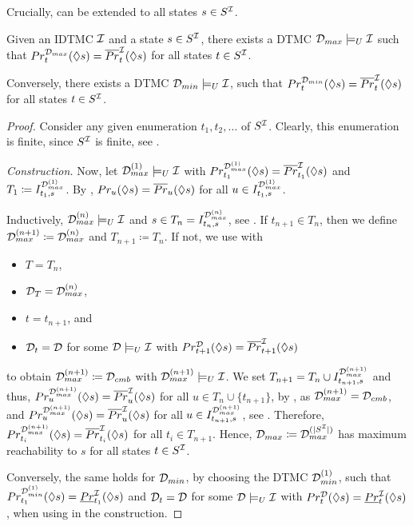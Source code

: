 Crucially,  can be extended to all states $s\in S^{\mathcal{I}}$.
\begin{theorem}\label{th:existence_of_dtmc_with_universal_max_reach}
    Given an IDTMC $\mathcal{I}$ and a state $s\in S^{\mathcal{I}}$, there exists a DTMC $\mathcal{D}_{max} \models_U \mathcal{I}$ such that $Pr_t^{\mathcal{D}_{max}}(\lozenge s) = \overline{Pr}^{\mathcal{I}}_t(\lozenge s)$ for all states $t\in S^{\mathcal{I}}$.

    Conversely, there exists a DTMC $\mathcal{D}_{min} \models_U \mathcal{I}$, such that $Pr_t^{\mathcal{D}_{min}}(\lozenge s) = \overline{Pr}^{\mathcal{I}}_t(\lozenge s)$ for all states $t\in S^{\mathcal{I}}$.
\end{theorem}

\begin{proof}
    Consider any given enumeration $t_1, t_2, \dots$ of $S^{\mathcal{I}}$. Clearly, this enumeration is finite, since $S^{\mathcal{I}}$ is finite, see .
    
    \emph{Construction.} Now, let $\mathcal{D}_{max}^{(1)}\models_U \mathcal{I}$ with $Pr_{t_1}^{\mathcal{D}_{max}^{(1)}}(\lozenge s) = \overline{Pr}^{\mathcal{I}}_{t_1}(\lozenge s)$ and $T_1 \coloneq I^{\mathcal{D}_{max}^{(1)}}_{t_1,s}$. By , $Pr_u(\lozenge s) = \overline{Pr}_u(\lozenge s)$ for all $u\in I^{\mathcal{D}_{max}^{(1)}}_{t_1,s}$.

    Inductively, $\mathcal{D}_{max}^{(n)} \models_U \mathcal{I}$ and $s\in T_n = I^{\mathcal{D}_{max}^{(n)}}_{t_n,s}$, see .
    If $t_{n+1}\in T_n$, then we define $\mathcal{D}_{max}^{(n+1)} \coloneq \mathcal{D}_{max}^{(n)}$ and $T_{n+1} \coloneq T_n$. If not, we use  with 
    \begin{itemize}
        \item $T = T_n$,
        \item $\mathcal{D}_T = \mathcal{D}_{max}^{(n)}$,
        \item $t = t_{n+1}$, and
        \item $\mathcal{D}_t = \mathcal{D}$ for some $\mathcal{D} \models_U \mathcal{I}$ with $Pr^{\mathcal{D}}_{t+1}(\lozenge s) = \overline{Pr}_{t+1}^{\mathcal{I}}(\lozenge s)$
    \end{itemize}
    to obtain $\mathcal{D}_{max}^{(n+1)} \coloneq \mathcal{D}_{cmb}$ with $\mathcal{D}_{max}^{(n+1)}\models_U \mathcal{I}$. We set $T_{n+1} = T_n \cup I^{\mathcal{D}_{max}^{(n+1)}}_{t_{n+1},s}$ and thus, $Pr_{u}^{\mathcal{D}_{max}^{(n+1)}}(\lozenge s) = \overline{Pr}_{u}^{\mathcal{I}}(\lozenge s)$ for all $u \in T_n\cup\{t_{n+1}\}$, by , as $\mathcal{D}_{max}^{(n+1)} = \mathcal{D}_{cmb}$, and $Pr_{u}^{\mathcal{D}_{max}^{(n+1)}}(\lozenge s) = \overline{Pr}_{u}^{\mathcal{I}}(\lozenge s)$ for all $u\in I^{\mathcal{D}_{max}^{(n+1)}}_{t_{n+1},s}$, see . Therefore, $Pr_{t_i}^{\mathcal{D}_{max}^{(n+1)}}(\lozenge s) = \overline{Pr}_{t_i}^{\mathcal{I}}(\lozenge s)$ for all $t_i \in T_{n+1}$. Hence, $\mathcal{D}_{max} \coloneq \mathcal{D}_{max}^{(|S^{\mathcal{I}}|)}$ has maximum reachability to $s$ for all states $t\in S^{\mathcal{I}}$.

    Conversely, the same holds for $\mathcal{D}_{min}$, by choosing the DTMC $\mathcal{D}_{min}^{(1)}$, such that $Pr^{\mathcal{D}_{min}^{(1)}}_{t_1}(\lozenge s) = \underline{Pr}_{t_1}^{\mathcal{I}}(\lozenge s)$ and $\mathcal{D}_t = \mathcal{D}$ for some $\mathcal{D} \models_U \mathcal{I}$ with $Pr^{\mathcal{D}}_t(\lozenge s) = \underline{Pr}_t^{\mathcal{I}}(\lozenge s)$, when using  in the construction.
\end{proof}

